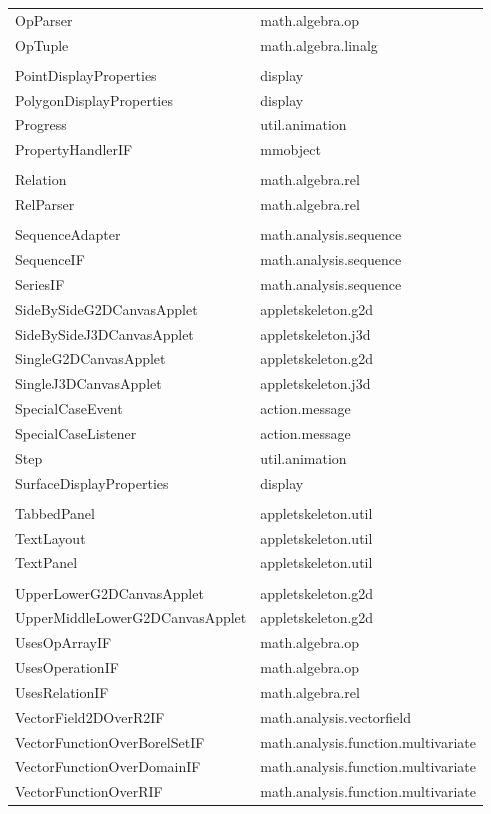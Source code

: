 \documentclass[a4paper,12pt]{book}
\begin{document}
\begin{appendix}
{\begin{longtable}{l | l}
    OpParser & math.algebra.op\\
    OpTuple & math.algebra.linalg\\
    \\  
    PointDisplayProperties & display\\
    PolygonDisplayProperties & display\\
    Progress & util.animation\\
    PropertyHandlerIF & mmobject\\
    \\
    Relation & math.algebra.rel\\
    RelParser & math.algebra.rel\\
    \\
    SequenceAdapter & math.analysis.sequence\\
    SequenceIF & math.analysis.sequence\\
    SeriesIF & math.analysis.sequence\\
    SideBySideG2DCanvasApplet & appletskeleton.g2d\\
    SideBySideJ3DCanvasApplet & appletskeleton.j3d\\
    SingleG2DCanvasApplet & appletskeleton.g2d\\
    SingleJ3DCanvasApplet & appletskeleton.j3d\\
    SpecialCaseEvent & action.message\\
    SpecialCaseListener & action.message\\
    Step & util.animation\\
    SurfaceDisplayProperties & display\\
    \\
    TabbedPanel & appletskeleton.util\\
    TextLayout & appletskeleton.util\\
    TextPanel & appletskeleton.util\\
    \\
    UpperLowerG2DCanvasApplet & appletskeleton.g2d\\
    UpperMiddleLowerG2DCanvasApplet & appletskeleton.g2d\\
    UsesOpArrayIF & math.algebra.op\\
    UsesOperationIF & math.algebra.op\\
    UsesRelationIF & math.algebra.rel
    \\
    VectorField2DOverR2IF & math.analysis.vectorfield\\
    VectorFunctionOverBorelSetIF & math.analysis.function.multivariate\\
    VectorFunctionOverDomainIF & math.analysis.function.multivariate\\
    VectorFunctionOverRIF & math.analysis.function.multivariate
    
  \end{longtable}
  }
  

\clearpage

\clearpage

\end{appendix}
\end{document}
